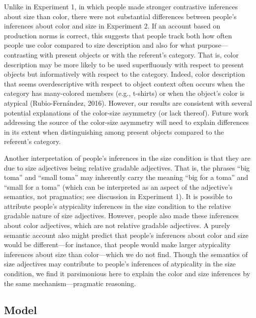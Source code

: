 \documentclass[
  english,
  man,floatsintext]{apa6}
\begin{document}
Unlike in Experiment 1, in which people made stronger contrastive inferences about size than color, there were not substantial differences between people's inferences about color and size in Experiment 2. If an account based on production norms is correct, this suggests that people track both how often people use color compared to size description and also for what purpose---contrasting with present objects or with the referent's category. That is, color description may be more likely to be used superfluously with respect to present objects but informatively with respect to the category. Indeed, color description that seems overdescriptive with respect to object context often occurs when the category has many-colored members (e.g., t-shirts) or when the object's color is atypical (Rubio-Fernández, 2016). However, our results are consistent with several potential explanations of the color-size asymmetry (or lack thereof). Future work addressing the source of the color-size asymmetry will need to explain differences in its extent when distinguishing among present objects compared to the referent's category.

Another interpretation of people's inferences in the size condition is that they are due to size adjectives being relative gradable adjectives. That is, the phrases ``big toma'' and ``small toma'' may inherently carry the meaning ``big for a toma'' and ``small for a toma'' (which can be interpreted as an aspect of the adjective's semantics, not pragmatics; see discussion in Experiment 1). It is possible to attribute people's atypicality inferences in the size condition to the relative gradable nature of size adjectives. However, people also made these inferences about color adjectives, which are not relative gradable adjectives. A purely semantic account also might predict that people's inferences about color and size would be different---for instance, that people would make larger atypicality inferences about size than color---which we do not find. Though the semantics of size adjectives may contribute to people's inferences of atypicality in the size condition, we find it parsimonious here to explain the color and size inferences by the same mechanism---pragmatic reasoning.

\hypertarget{model-1}{%
\subsection{Model}\label{model-1}}
\end{document}
